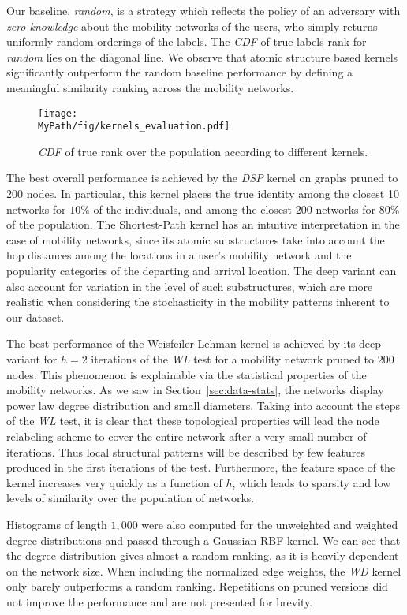 Our baseline, \emph{random}, is a strategy which reflects the policy of an adversary with \emph{zero knowledge} about the mobility networks of the users, who simply returns uniformly random orderings of the labels.
The \emph{CDF} of true labels rank for \emph{random}  lies on the diagonal line.
We observe that atomic structure based kernels significantly outperform the random baseline performance by defining a meaningful similarity ranking across the mobility networks.

\begin{figure}[!t]
	\centering
	\texttt{[image: \\MyPath/fig/kernels\_evaluation.pdf]}
	\caption{\emph{CDF} of true rank over the population according to different kernels.}
	\label{fig:kernels_evaluation}
\end{figure}

The best overall performance is achieved by the \emph{DSP} kernel on graphs pruned to $ 200 $ nodes.
In particular, this kernel places the true identity among the closest 10 networks for $10\%$ of the individuals, and among the closest $ 200 $ networks for $ 80\%$ of the population.
The Shortest-Path kernel has an intuitive interpretation in the case of mobility networks, since its atomic substructures take into account the hop distances among the locations in a user's mobility network and the popularity categories of the departing and arrival location.
The deep variant can also account for variation in the level of such substructures, which are more realistic when considering the stochasticity in the mobility patterns inherent to our dataset.

The best performance of the Weisfeiler-Lehman kernel is achieved by its deep variant for $ h=2 $ iterations of the \emph{WL} test for a mobility network pruned to $200$ nodes.
This phenomenon is explainable via the statistical properties of the mobility networks.
As we saw in Section~\ref{sec:data-stats}, the networks display power law degree distribution and small diameters.
Taking into account the steps of the \emph{WL} test, it is clear that these topological properties will lead the node relabeling scheme to cover the entire network after a very small number of iterations.
Thus local structural patterns will be described by few features produced in the first iterations of the test.
Furthermore, the feature space of the kernel increases very quickly as a function of $ h $, which leads to sparsity and low levels of similarity over the population of networks.

Histograms of length $1,000$ were also computed for the unweighted and weighted degree distributions and passed through a Gaussian RBF kernel.
We can see that the degree distribution gives almost a random ranking, as it is heavily dependent on the network size.
When including the normalized edge weights, the \emph{WD} kernel only barely outperforms a rand\label{key}om ranking.
Repetitions on pruned versions did not improve the performance and are not presented for brevity.


